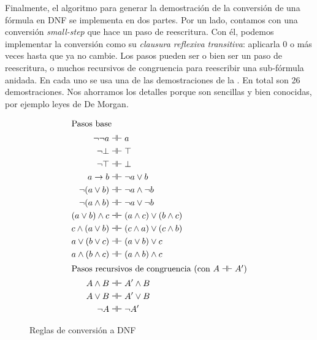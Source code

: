 Finalmente, el algoritmo para generar la demostración de la conversión de una
fórmula en DNF se implementa en dos partes. Por un lado, contamos con una
conversión \textit{small-step} que hace un paso de reescritura. Con él, podemos
implementar la conversión como su \textit{clausura reflexiva transitiva}:
aplicarla 0 o más veces hasta que ya no cambie. Los pasos pueden ser o bien ser
un paso de reescritura, o muchos recursivos de congruencia para reescribir una sub-fórmula anidada. En cada uno se usa una de las demostraciones de la . En total son 26 demostraciones. Nos ahorramos los detalles porque son sencillas y bien conocidas, por ejemplo leyes de De Morgan.
\begin{figure}[H]
    \begin{align*}
        \intertext{Pasos base}
        \neg\neg a &\dashv\vdash
            a
            \\
        \neg \bot &\dashv\vdash
            \top\\
        \neg \top &\dashv\vdash
            \bot\\
        a \to b &\dashv\vdash
            \neg a \vee b
            \\
        \neg(a \vee b) &\dashv\vdash
            \neg a \wedge \neg b
            \\
        \neg(a \wedge b) &\dashv\vdash
            \neg a \vee \neg b
            \\
        (a \vee b) \wedge c &\dashv\vdash
            (a \wedge c) \vee (b \wedge c)
            \\
        c \wedge (a \vee b) &\dashv\vdash
            (c \wedge a) \vee (c \wedge b)
            \\
        a \vee (b \vee c) &\dashv\vdash
            (a \vee b) \vee c
            \\
        a \wedge (b \wedge c) &\dashv\vdash
            (a \wedge b) \wedge c\\
        \intertext{Pasos recursivos de congruencia (con $A \dashv\vdash A'$)}
        A \wedge B &\dashv\vdash A' \wedge B\\
        A \vee B &\dashv\vdash A' \vee B\\
        \neg A &\dashv\vdash \neg A'
    \end{align*}
    \caption{Reglas de conversión a DNF}
    \label{ppa-cert:dnf-rules}
\end{figure}

